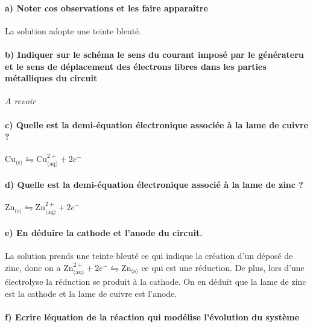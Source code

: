 \documentclass[a4paper, 12pt]{scrartcl}
\begin{document}
\paragraph*{a) Noter cos observations et les faire apparaître \\[5mm]}

La solution adopte une teinte bleuté.

\paragraph*{b) Indiquer sur le schéma le sens du courant imposé par le générateru 
et le sens de déplacement des électrons libres dans les parties métalliques du circuit \\[5mm]}

\emph{A revoir}

\paragraph*{c) Quelle est la demi-équation électronique associée à la lame de cuivre ? \\[5mm]}

$\text{Cu}_{\text{(s)}} \leftrightharpoons \text{Cu}^{2+}_{\text{(aq)}} + 2e^-$

\paragraph*{d) Quelle est la demi-équation électronique associé à la lame de zinc ? \\[5mm]}

$ \text{Zn}_{\text{(s)}} \leftrightharpoons \text{Zn}^{2+}_{\text{(aq)}} + 2e^- $

\paragraph*{e) En déduire la cathode et l'anode du circuit. \\[5mm]}

La solution prends une teinte bleuté ce qui indique la création d'un déposé de zinc, donc on a 
$\text{Zn}^{2+}_{\text{(aq)}} + 2e^- \leftrightharpoons \text{Zn}_{\text{(s)}}$ ce qui est une réduction. 
De plus, lors d'une électrolyse la réduction se produit à la cathode. On en déduit que la lame de zinc est la cathode et la lame de cuivre est l'anode.

\paragraph*{f) Ecrire léquation de la réaction qui modélise l'évolution du système \\[5mm]}
\end{document}
